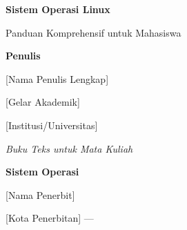 
\begin{titlepage}
    \centering
    \vspace*{2cm}


    {\Huge\bfseries Sistem Operasi Linux\par}
    \vspace{0.5cm}
    {\Large Panduan Komprehensif untuk Mahasiswa\par}
    \vspace{2cm}

    {\Large\textbf{Penulis}\par}
    \vspace{0.5cm}
    {\large [Nama Penulis Lengkap]\par}
    \vspace{0.3cm}
    {\normalsize [Gelar Akademik]\par}
    {\normalsize [Institusi/Universitas]\par}

    \vfill

    {\large \textit{Buku Teks untuk Mata Kuliah}\par}
    {\large \textbf{Sistem Operasi}\par}

    \vfill


    {\large [Nama Penerbit]\par}
    {\large [Kota Penerbitan] --- \the\year\par}

\end{titlepage}

\cleardoublepage
